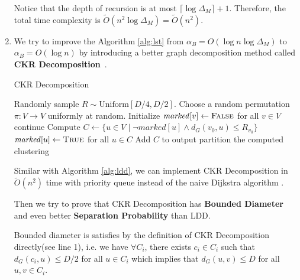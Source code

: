 \begin{answer}
\begin{enumerate}[label=\alph*).]
        Notice that the depth of recursion is at most $\lceil \log \Delta_M \rceil + 1$. Therefore, the total time complexity is $\tilde{O}(n^2\log \Delta_M) = \tilde{O}(n^2)$.
        \item We try to improve the Algorithm \ref{alg:lst} from $\alpha_B = O(\log n \log \Delta_M)$ to $\alpha_B = O(\log n)$ by introducing a better graph decomposition method called 
        \textbf{CKR Decomposition}~\cite{CKR_Decomposition}.
        \begin{algo}
            \caption{CKR Decomposition}
            \label{alg:ckr}
            \begin{algorithmic}[1]
                \State Randomly sample $R \sim \text{Uniform}[D/4, D/2]$.
                \State Choose a random permutation $\pi: V \to V$ uniformly at random.
                \State Initialize $\mathit{marked}[v] \gets \textsc{False}$ for all $v \in V$
                        \State continue     
                    \EndIf
                    \State Compute $C \gets \{u \in V \mid \lnot marked[u] \land  d_G(v_0,u) \leq R_{v_0}\}$
                    \State $\mathit{marked}[u] \gets \textsc{True}$ for all $u \in C$
                    \State Add $C$ to output partition
                \EndFor
                \State \Return the computed clustering
            \end{algorithmic}
        \end{algo}
        Similar with Algorithm \ref{alg:ldd}, we can implement CKR Decomposition in $\tilde{O}(n^2)$ time with priority queue instead of the naive Dijkstra algorithm \cite{mendel2009fastckrpartitionssparse}.

        Then we try to prove that CKR Decomposition has \textbf{Bounded Diameter} and even better \textbf{Separation Probability} than LDD.
        
        Bounded diameter is satisfies by the definition of CKR Decomposition directly(see line 1), i.e. we have 
            $\forall C_i$, there exists $c_i \in C_i$ such that $d_G(c_i, u) \leq D/2$ for all $u \in C_i$ which implies that $d_G(u, v) \leq D$ for all $u, v \in C_i$.
        

\end{enumerate}
\end{answer}
